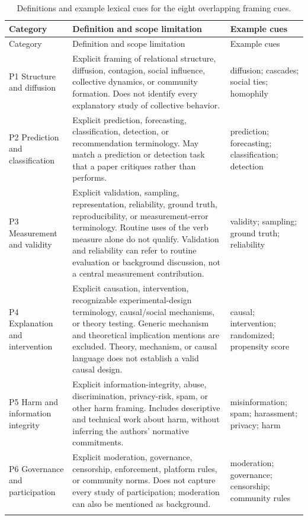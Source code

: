 \begingroup
\small
\begin{longtable}{@{}p{}p{}p{}@{}}
\caption{Definitions and example lexical cues for the eight overlapping framing cues.}\label{tab:codebook}\\
\toprule
Category & Definition and scope limitation & Example cues \\
\midrule
\endfirsthead
\toprule
Category & Definition and scope limitation & Example cues \\
\midrule
\endhead
\bottomrule
\endfoot
P1 Structure and diffusion & Explicit framing of relational structure, diffusion, contagion, social influence, collective dynamics, or community formation. Does not identify every explanatory study of collective behavior. & diffusion; cascades; social ties; homophily \\ \addlinespace
P2 Prediction and classification & Explicit prediction, forecasting, classification, detection, or recommendation terminology. May match a prediction or detection task that a paper critiques rather than performs. & prediction; forecasting; classification; detection \\ \addlinespace
P3 Measurement and validity & Explicit validation, sampling, representation, reliability, ground truth, reproducibility, or measurement-error terminology. Routine uses of the verb measure alone do not qualify. Validation and reliability can refer to routine evaluation or background discussion, not a central measurement contribution. & validity; sampling; ground truth; reliability \\ \addlinespace
P4 Explanation and intervention & Explicit causation, intervention, recognizable experimental-design terminology, causal/social mechanisms, or theory testing. Generic mechanism and theoretical implication mentions are excluded. Theory, mechanism, or causal language does not establish a valid causal design. & causal; intervention; randomized; propensity score \\ \addlinespace
P5 Harm and information integrity & Explicit information-integrity, abuse, discrimination, privacy-risk, spam, or other harm framing. Includes descriptive and technical work about harm, without inferring the authors' normative commitments. & misinformation; spam; harassment; privacy; harm \\ \addlinespace
P6 Governance and participation & Explicit moderation, governance, censorship, enforcement, platform rules, or community norms. Does not capture every study of participation; moderation can also be mentioned as background. & moderation; governance; censorship; community rules \\ \addlinespace

\end{longtable}

